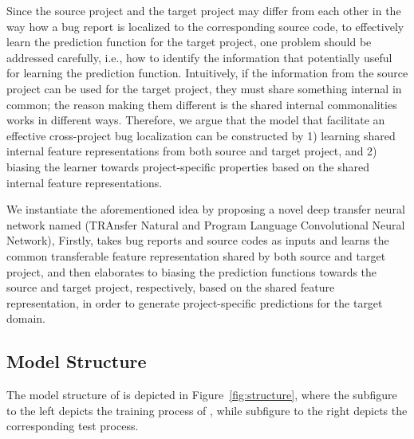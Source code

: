 Since the source project and the target project may differ from each other in the way how a bug report is localized to the corresponding source code, to effectively learn the prediction function for the target project, one problem should be addressed carefully, i.e., how to identify the information that potentially useful for learning the prediction function. Intuitively, if the information from the source project can be used for the target project, they must share something internal in common; the reason making them different is the shared internal commonalities works in different ways. Therefore, we argue that the model that facilitate an effective cross-project bug localization can be constructed by 1) learning shared internal feature representations from both source and target project, and 2) biasing the learner towards project-specific properties based on the shared internal feature representations. 

We instantiate the aforementioned idea by proposing a novel deep transfer neural network named \TRANPCNN (TRAnsfer Natural and Program Language Convolutional Neural Network), Firstly, \TRANPCNN takes bug reports and source codes as inputs and learns the common transferable feature representation shared by both source and target project, and then elaborates to biasing the prediction functions towards the source and target project, respectively, based on the shared feature representation, in order to generate project-specific predictions for the target domain.


\subsection{Model Structure}
The model structure of \TRANPCNN is depicted in Figure~\ref{fig:structure}, where the subfigure to the left depicts the training process of \TRANPCNN, while subfigure to the right depicts the corresponding test process. 

